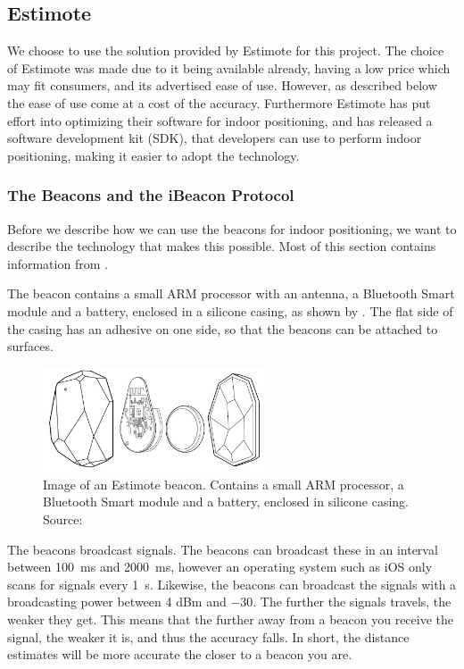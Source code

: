 \subsection{Estimote}
\label{sec:indoor-positioning:estimote}
We choose to use the solution provided by Estimote for this project.
The choice of Estimote was made due to it being available already, 
having a low price which may fit consumers, 
and its advertised ease of use. 
However, as described below the ease of use come at a cost of the accuracy.
Furthermore Estimote has put effort into optimizing their software for indoor positioning, 
and has released a software development kit (SDK),
that developers can use to perform indoor positioning, 
making it easier to adopt the technology.

\subsubsection{The Beacons and the iBeacon Protocol}
Before we describe how we can use the beacons for indoor positioning, 
we want to describe the technology that makes this possible. 
Most of this section contains information from \cite{ESTIMOTEBEACON}.

The beacon contains a small ARM processor with an antenna, 
a Bluetooth Smart module and a battery, enclosed in a silicone casing,
as shown by .
The flat side of the casing has an adhesive on one side, 
so that the beacons can be attached to surfaces. 

\begin{figure}[!htb]
  \centering
  \includegraphics[width=0.6\textwidth]{images/estimotebeacon}
  \caption{Image of an Estimote beacon. Contains a small ARM processor, a Bluetooth Smart module and a battery, enclosed in silicone casing. Source: \protect\cite{ESTIMOTEBEACON}}
  \label{fig:estimotebeacon}
\end{figure}

The beacons broadcast signals. 
The beacons can broadcast these in an interval between \SI{100}{\milli\second} and \SI{2000}{\milli\second},
however an operating system such as iOS only scans for signals every \SI{1}{\second}.
Likewise, the beacons can broadcast the signals with a broadcasting power between \num{4} dBm and \num{-30}.
The further the signals travels, the weaker they get.
This means that the further away from a beacon you receive the signal, 
the weaker it is, and thus the accuracy falls. 
In short, the distance estimates will be more accurate the closer to a beacon you are. 

